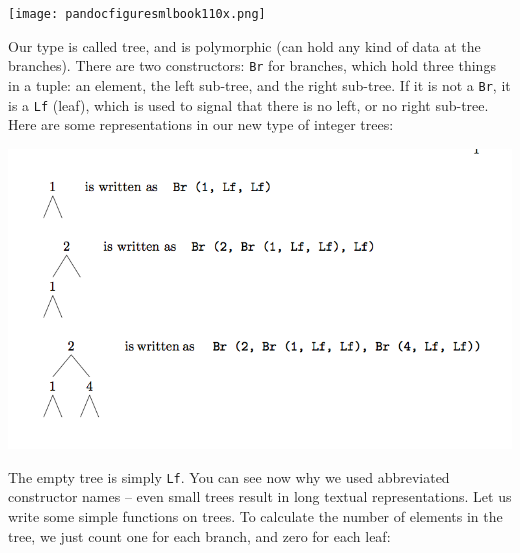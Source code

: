 \documentclass[]{book}
\newcommand{\smspace}{\vspace{4mm}}
\begin{document}
\medskip
\begin{center}
\noindent\texttt{[image: pandocfiguresmlbook110x.png]}
\end{center}
\medskip

\noindent Our type is called \textsf{tree}, and is polymorphic (can hold any kind of data at the branches). There are two constructors: \texttt{Br} for branches, which hold three things in a tuple: an element, the left sub-tree, and the right sub-tree. If it is not a \texttt{Br}, it is a \texttt{Lf} (leaf), which is used to signal that there is no left, or no right sub-tree. Here are some representations in our new type of integer trees:

\smspace

\includegraphics{kindlefig3.png}




\smspace

\noindent The empty tree is simply \texttt{Lf}. You can see now why we used abbreviated constructor names -- even small trees result in long textual representations. Let us write some simple functions on trees. To calculate the number of elements in the tree, we just count one for each branch, and zero for each leaf:
\end{document}
